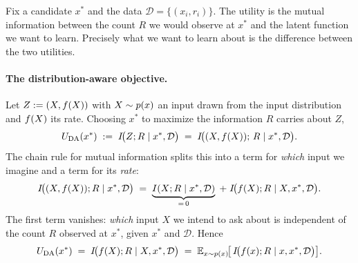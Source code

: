 Fix a candidate $x^{*}$ and the data $\mathcal D=\{(x_i,r_i)\}$. The utility is the
mutual information between the count $R$ we would observe at $x^{*}$ and the latent
function we want to learn. Precisely what we want to learn about is the difference
between the two utilities.

\paragraph{The distribution-aware objective.}
Let $Z:=(X,f(X))$ with $X\sim p(x)$ an input drawn from the input distribution
and $f(X)$ its rate. Choosing $x^{*}$ to maximize the information $R$ carries
about $Z$,
%
\begin{equation}
  U_{\mathrm{DA}}(x^{*}) \;:=\; I\!\big(Z;R\mid x^{*},\mathcal D\big)
             \;=\; I\!\big((X,f(X));\,R\mid x^{*},\mathcal D\big).
  \label{eq:da-objective}
\end{equation}
%
The chain rule for mutual information splits this into a term for \emph{which} input
we imagine and a term for its \emph{rate}:
%
\begin{equation}
  I\!\big((X,f(X));R\mid x^{*},\mathcal D\big)
  \;=\;
  \underbrace{I(X;R\mid x^{*},\mathcal D)}_{=\,0}
  \;+\;
  I\!\big(f(X);R\mid X,x^{*},\mathcal D\big).
  \label{eq:mi-chain}
\end{equation}
%
The first term vanishes: \emph{which} input $X$ we intend to ask about is
independent of the count $R$ observed at $x^{*}$, given $x^{*}$ and $\mathcal D$.
Hence
%
\begin{equation}
  U_{\mathrm{DA}}(x^{*})
  \;=\; I\!\big(f(X);R\mid X,x^{*},\mathcal D\big)
  \;=\; \mathbb{E}_{x\sim p(x)}\!\big[\,I\!\big(f(x);R\mid x,x^{*},\mathcal D\big)\big].
  \label{eq:da-expectation}
\end{equation}

